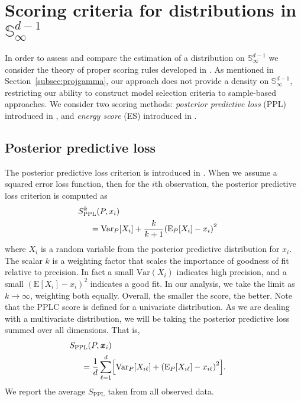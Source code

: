 \section{Scoring criteria for distributions in ${\mathbb S}_\infty^{d-1}$\label{sec:evaluation}}

In order to assess and compare the estimation of a distribution on ${\mathbb S}_\infty^{d-1}$ we consider the theory of proper scoring rules developed in \cite{gneiting2007}.
As mentioned in Section~\ref{subsec:projgamma}, our approach does not provide a density on ${\mathbb S}_{\infty}^{d-1}$, restricting our ability to construct model selection criteria to sample-based approaches.  We consider two scoring methods:  \emph{posterior predictive loss} (PPL) introduced in \cite{gelfand1998}, and \emph{energy score} (ES) introduced in \cite{gneiting2007}.

\subsection{Posterior predictive loss}
The posterior predictive loss criterion is introduced in \cite{gelfand1998}.  When we
  assume a squared error loss function, then for the $i$th observation, the posterior predictive
  loss criterion is computed as
  \begin{equation}
    \label{eq:ppl}
    \begin{aligned}
      &\hspace{-0.5cm}S_{\text{PPL}}^k\left(P,x_i\right) \\
      &= \text{Var}_P\left[X_i\right] + \frac{k}{k+1}\left(\text{E}_P\left[X_{i}\right] - x_i\right)^2
    \end{aligned}
  \end{equation}
  where $X_i$ is a random variable from the posterior predictive distribution for $x_i$.  The
  scalar $k$ is a weighting factor that scales the importance of goodness of fit
  relative to precision.  In fact a small $\text{Var}(X_{i})$ indicates high
  precision, and a small $(\text{E}[X_{i}] - x_{i})^2$  indicates a good fit.  In our analysis,
  we take the limit as $k\to\infty$, weighting both
  equally. Overall, the smaller the score, the better.  Note that the PPLC score is defined 
  for a univariate distribution.  As we are dealing
  with a multivariate distribution, we will be taking the posterior predictive loss
  summed over all dimensions.  That is,
  \begin{equation}
    \label{eq:ppl2}
    \begin{aligned}
      &\hspace{-0.5cm}S_{\text{PPL}}\left(P,\bm{x}_i\right) \\
      &= \frac{1}{d}\sum_{\ell = 1}^d\left[\text{Var}_P\left[X_{i\ell}\right] + \left(\text{E}_P\left[X_{i\ell}\right] - x_{i\ell}\right)^2\right].
    \end{aligned}
  \end{equation}
  We report the average $S_{\text{PPL}}$ taken from all observed data.

